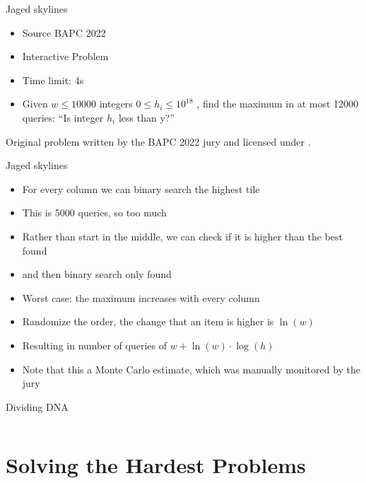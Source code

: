 \documentclass[11pt,pdf, aspectratio=169]{beamer}
\begin{document}
  \begin{frame}{Jaged skylines}
    \begin{itemize}
      \item Source BAPC 2022
      \item Interactive Problem
      \item Time limit: 4s
      \item  Given $w \leq 10000$ integers $0 \leq h_i \leq 10^{18}$ , find the maximum in at most 12000 queries: ``Is integer $h_i$ less than y?''
    \end{itemize}
    Original problem written by the BAPC 2022 jury and licensed under \doclicenseLongNameRef.

    \doclicenseImage
  \end{frame}
  \begin{frame}{Jaged skylines}
    \begin{itemize}
      \item For every column we can binary search the highest tile
      \item This is 5000 queries, so too much
      \item Rather than start in the middle, we can check if it is higher than the best found
      \item and then binary search only found
      \item Worst case: the maximum increases with every column
      \item Randomize the order, the change that an item is higher is $\ln(w)$
      \item Resulting in number of queries of $w+\ln(w)\cdot \log(h)$
      \item Note that this a Monte Carlo estimate, which was manually monitored by the jury
    \end{itemize}
  \end{frame}
  \begin{frame}[containsverbatim]{Dividing DNA}
    \inputminted{python}{code/session-4/bapc-j.py}
  \end{frame}


  \section{Solving the Hardest Problems}
\end{document}
